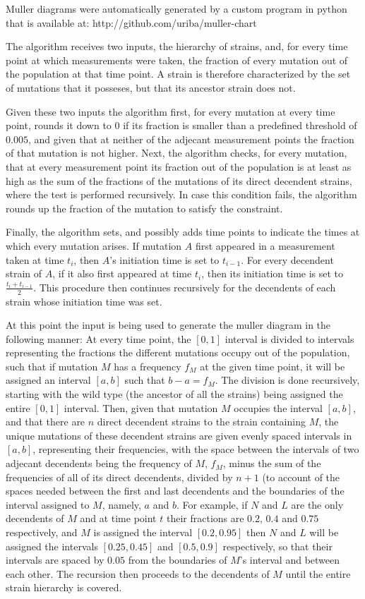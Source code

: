 \documentclass[notitlepage]{article}
\begin{document}
Muller diagrams were automatically generated by a custom program in python that is available at: http://github.com/uriba/muller-chart

The algorithm receives two inputs, the hierarchy of strains, and, for every time point at which measurements were taken, the fraction of every mutation out of the population at that time point.
A strain is therefore characterized by the set of mutations that it posseses, but that its ancestor strain does not.

Given these two inputs the algorithm first, for every mutation at every time point, rounds it down to $0$ if its fraction is smaller than a predefined threshold of $0.005$, and given that at neither of the adjecant measurement points the fraction of that mutation is not higher.
Next, the algorithm checks, for every mutation, that at every measurement point its fraction out of the population is at least as high as the sum of the fractions of the mutations of its direct decendent strains, where the test is performed recursively.
In case this condition fails, the algorithm rounds up the fraction of the mutation to satisfy the constraint.

Finally, the algorithm sets, and possibly adds time points to indicate the times at which every mutation arises.
If mutation $A$ first appeared in a measurement taken at time $t_i$, then $A$'s initiation time is set to $t_{i-1}$.
For every decendent strain of $A$, if it also first appeared at time $t_i$, then its initiation time is set to $\frac{t_i+t_{i-1}}{2}$.
This procedure then continues recursively for the decendents of each strain whose initiation time was set.

At this point the input is being used to generate the muller diagram in the following manner:
At every time point, the $[0,1]$ interval is divided to intervals representing the fractions the different mutations occupy out of the population, such that if mutation $M$ has a frequency $f_M$ at the given time point, it will be assigned an interval $[a,b]$ such that $b-a=f_M$.
The division is done recursively, starting with the wild type (the ancestor of all the strains) being assigned the entire $[0,1]$ interval.
Then, given that mutation $M$ occupies the interval $[a,b]$, and that there are $n$ direct decendent strains to the strain containing $M$, the unique mutations of these decendent strains are given evenly spaced intervals in $[a,b]$, representing their frequencies, with the space between the intervals of two adjecant decendents being the frequency of $M$, $f_M$, minus the sum of the frequencies of all of its direct decendents, divided by $n+1$ (to account of the spaces needed between the first and last decendents and the boundaries of the interval assigned to $M$, namely, $a$ and $b$.
For example, if $N$ and $L$ are the only decendents of $M$ and at time point $t$ their fractions are $0.2$, $0.4$ and $0.75$ respectively, and $M$ is assigned the interval $[0.2,0.95]$ then $N$ and $L$ will be assigned the intervals $[0.25,0.45]$ and $[0.5,0.9]$ respectively, so that their intervals are spaced by $0.05$ from the boundaries of $M$'s interval and between each other.
The recursion then proceeds to the decendents of $M$ until the entire strain hierarchy is covered.
\end{document}
